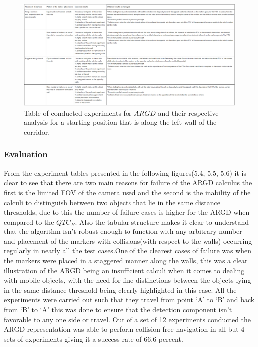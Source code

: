 \begin{figure}
	\centering
	\includegraphics[scale = 0.6]{images/argd_left}
	\caption{Table of conducted experiments for $ARGD$ and their respective analysis for a starting position that is along the left wall of the corridor.}
	\label{fig:argdleft}
\end{figure}
 
\subsubsection*{Evaluation} From the experiment tables presented in the following figures(5.4, 5.5, 5.6) it is clear to see that there are two main reasons for failure of the ARGD calculus the first is the limited FOV of the camera used and the second is the inability of the calculi to distinguish between two objects that lie in the same distance thresholds, due to this the number of failure cases is higher for the ARGD when compared to the $QTC_B$. Also the tabular structure makes it clear to understand that the algorithm isn't robust enough to function with any arbitrary number and placement of the markers with collisions(with respect to the walls) occurring regularly in nearly all the test cases.One of the clearest cases of failure was when the markers were placed in a staggered manner along the walls, this was a clear illustration of the ARGD being an insufficient calculi when it comes to dealing with mobile objects, with the need for fine distinctions between the objects lying in the same distance threshold being clearly highlighted in this case. All the experiments were carried out such that they travel from point `A' to `B' and back from `B' to `A' this was done to ensure that the detection component isn't favorable to any one side or travel. Out of a set of 12 experiments conducted the ARGD representation was able to perform collision free navigation in all but 4 sets of experiments giving it a success rate of 66.6 percent.

